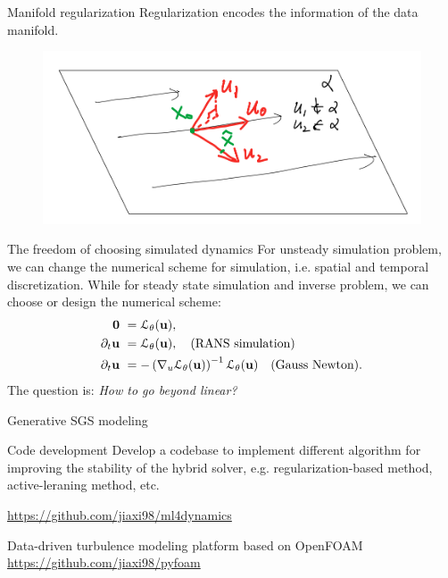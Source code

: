 \documentclass{beamer}
\begin{document}
\begin{frame}{Manifold regularization}
	Regularization encodes the information of the data manifold.
	\begin{figure}[H]
		\centering
		\centerline{\includegraphics[width=0.9\linewidth]{fig/mfd.png}}
	\end{figure}
\end{frame}

\begin{frame}{The freedom of choosing simulated dynamics}
	For unsteady simulation problem, we can change the numerical scheme for simulation, i.e.
	spatial and temporal discretization. While for steady state simulation and inverse problem, we can 
	choose or design the numerical scheme:
	\begin{equation}
		\begin{aligned}
			\mathbf{0} & \ = \mathcal{L}_{\theta}(\mathbf{u}),	\\
		  \partial_t \mathbf{u} & \ = \mathcal{L}_{\theta}(\mathbf{u}), \quad \text{(RANS simulation)}   \\
		  \partial_t \mathbf{u} & \ = - \left( \nabla_u\mathcal{L}_{\theta}(\mathbf{u}) \right)^{-1} \mathcal{L}_{\theta}(\mathbf{u}) \quad \text{(Gauss Newton)}.
		\end{aligned}
	\end{equation}  
	The question is: \textit{How to go beyond linear?}
\end{frame}

\begin{frame}{Generative SGS modeling}
	
\end{frame}



\begin{frame}{Code development}
	Develop a codebase to implement different algorithm for improving the stability
	of the hybrid solver, e.g. regularization-based method, active-leraning method, etc.

	\url{https://github.com/jiaxi98/ml4dynamics}

	Data-driven turbulence modeling platform based on OpenFOAM
	\url{https://github.com/jiaxi98/pyfoam}
\end{frame}
\end{document}
